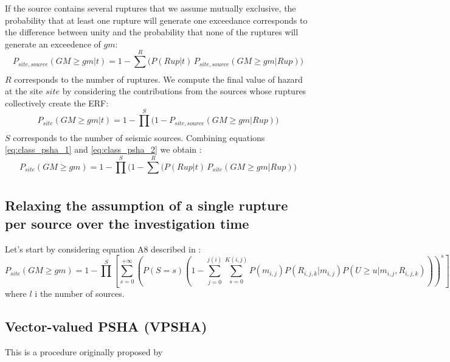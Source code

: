 %

%
If the source contains several ruptures that we assume mutually exclusive, 
the probability that at least one rupture will generate one exceedance 
corresponds to the difference between unity and the probability that none 
of the ruptures will generate an exceedence of $gm$:
\begin{equation}
P_{site,source}(GM\geq gm|t) = 1 - \sum_{}^{R} \Big( P(Rup|t)\,P_{site,source}(GM\geq gm|Rup) \Big)
\label{eq:class_psha_1}
\end{equation}
$R$ corresponds to the number of ruptures. We compute the final value of 
hazard at the site $site$ by considering the contributions from the sources
whose ruptures collectively create the ERF:
%
\begin{equation}
P_{site}(GM \geq gm|t) = 1 - \prod_{}^{S} \Big( 1-P_{site,source}(GM\geq gm|Rup) \Big)
\label{eq:class_psha_2}
\end{equation}
%
$S$ corresponds to the number of seismic sources. Combining equations 
\ref{eq:class_psha_1} and \ref{eq:class_psha_2} we obtain 
\cite[][equation 4, page 410]{field2003}:
%
\begin{equation}
P_{site}(GM\geq gm)=1-\prod\limits_{}^{S} 
	\Big( 
		1-\sum_{}^{R} \Big( P(Rup|t)\,P_{site}(GM\geq gm|Rup)
	\Big)
\label{eq:PSHA_calculation}
\end{equation}

\subsection{Relaxing the assumption of a single rupture per source over 
the investigation time}
%
Let's start by considering equation A8 described in \citet{field2003}:
%
\begin{equation}
P_{site}(GM\geq gm)= 
	1-\prod\limits_{}^{S} 
	\left[\sum\limits_{s=0}^{+\infty}
	\left(P(S=s) 
	\left(
		1-\sum\limits_{j=0}^{j(i)}\sum\limits_{s=0}^{K(i,j)} 
		P(m_{i,j}) 
		P(R_{i,j,k}|m_{i,j}) P(U\geq u|m_{i,j},R_{i,j,k})
	\right)
	\right)^{s}
	\right] 
\end{equation}
where $l$ i the number of sources.

\subsection{Vector-valued PSHA (VPSHA)}
This is a procedure originally proposed by \citet{bazzurro2002}
%
\clearpage\newpage
